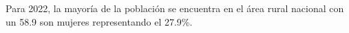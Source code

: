 Para 2022, la mayoría de la población se encuentra en el área rural nacional con un 58.9 son mujeres representando el 27.9\%. 